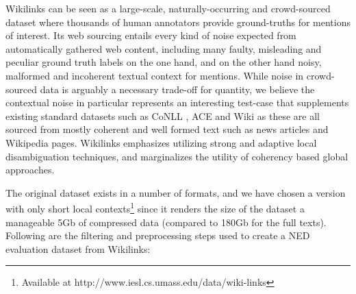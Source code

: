 \documentclass[11pt]{article}
\begin{document}
Wikilinks can be seen as a large-scale, naturally-occurring and crowd-sourced dataset where thousands of human annotators provide ground-truths for mentions of interest. Its web sourcing entails every kind of noise expected from automatically gathered web content, including many faulty, misleading and peculiar ground truth labels on the one hand, and on the other hand noisy, malformed and incoherent textual context for mentions. While noise in crowd-sourced data is arguably a necessary trade-off for quantity, we believe the contextual noise in particular represents an interesting test-case that supplements existing standard datasets such as CoNLL \cite{hoffart2011robust}, ACE and Wiki \cite{ratinov2011local} as these are all sourced from mostly coherent and well formed text such as news articles and Wikipedia pages. Wikilinks emphasizes utilizing strong and adaptive local disambiguation techniques, and marginalizes the utility of coherency based global approaches.

The original dataset exists in a number of formats, and we have chosen a version with only short local contexts\footnote{Available at http://www.iesl.cs.umass.edu/data/wiki-links} since it renders the size of the dataset a manageable 5Gb of compressed data (compared to 180Gb for the full texts). Following are the filtering and preprocessing steps used to create a NED evaluation dataset from Wikilinks:
\end{document}
